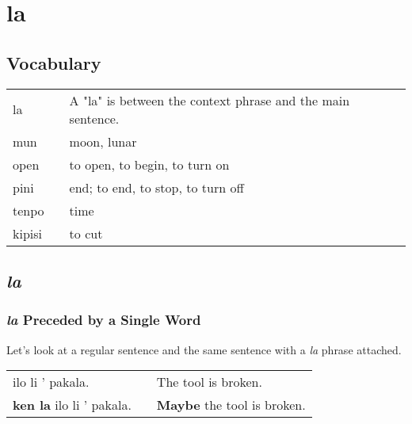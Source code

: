 \section{la}
%
\subsection*{Vocabulary}
%
\begin{supertabular}{p{5,5cm}|ll}
la && A "la" is between the context phrase and the main sentence. \\
mun && moon, lunar  \\
open && to open, to begin, to turn on \\
pini && end; to end, to stop, to turn off \\
tenpo && time \\
kipisi &&  to cut \\
\end{supertabular} 
%
\subsection*{\textit{la}}
%
\subsubsection*{\textit{la} Preceded by a Single Word}
%
Let's look at a regular sentence and the same sentence with a \textit{la} phrase attached. 

\begin{supertabular}{p{5,5cm}|ll}
ilo li ' pakala. && The tool is broken. \\
\textbf{ken la} ilo li ' pakala. && \textbf{Maybe} the tool is broken. \\
\end{supertabular} 

